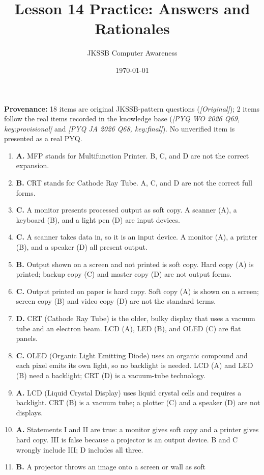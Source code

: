 \documentclass[11pt]{article}
\title{Lesson 14 Practice: Answers and Rationales}
\author{JKSSB Computer Awareness}
\date{\today}
\begin{document}
\maketitle
\noindent\textbf{Provenance:} 18 items are original JKSSB-pattern questions
(\textit{[Original]}); 2 items follow the real items recorded in the knowledge
base (\textit{[PYQ WO 2026 Q69, key:provisional]} and
\textit{[PYQ JA 2026 Q68, key:final]}). No unverified item is presented as a
real PYQ.
\begin{enumerate}[label=\textbf{Q\arabic*.}, leftmargin=*]
\item \textbf{A.} MFP stands for Multifunction Printer. B, C, and D are not
  the correct expansion.
\item \textbf{B.} CRT stands for Cathode Ray Tube. A, C, and D are not the
  correct full forms.
\item \textbf{C.} A monitor presents processed output as soft copy. A scanner
  (A), a keyboard (B), and a light pen (D) are input devices.
\item \textbf{C.} A scanner takes data in, so it is an input device. A monitor
  (A), a printer (B), and a speaker (D) all present output.
\item \textbf{B.} Output shown on a screen and not printed is soft copy. Hard
  copy (A) is printed; backup copy (C) and master copy (D) are not output
  forms.
\item \textbf{C.} Output printed on paper is hard copy. Soft copy (A) is shown
  on a screen; screen copy (B) and video copy (D) are not the standard terms.
\item \textbf{D.} CRT (Cathode Ray Tube) is the older, bulky display that uses
  a vacuum tube and an electron beam. LCD (A), LED (B), and OLED (C) are flat
  panels.
\item \textbf{C.} OLED (Organic Light Emitting Diode) uses an organic compound
  and each pixel emits its own light, so no backlight is needed. LCD (A) and
  LED (B) need a backlight; CRT (D) is a vacuum-tube technology.
\item \textbf{A.} LCD (Liquid Crystal Display) uses liquid crystal cells and
  requires a backlight. CRT (B) is a vacuum tube; a plotter (C) and a speaker
  (D) are not displays.
\item \textbf{A.} Statements I and II are true: a monitor gives soft copy and
  a printer gives hard copy. III is false because a projector is an output
  device. B and C wrongly include III; D includes all three.
\item \textbf{B.} A projector throws an image onto a screen or wall as soft

\end{enumerate}
\end{document}
